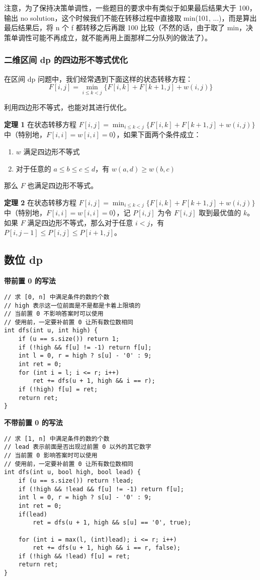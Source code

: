 \documentclass[UTF8]{article}
\begin{document}
注意，为了保持决策单调性，一些题目的要求中有类似于如果最后结果大于 100，输出 no solution，这个时候我们不能在转移过程中直接取 min(101, ...)，而是算出最后结果后，将 n 个 f 都转移之后再跟 100 比较（不然的话，由于取了 min，决策单调性可能不再成立，就不能再用上面那样二分队列的做法了）。

\subsubsection{二维区间 dp 的四边形不等式优化}
在区间 dp 问题中，我们经常遇到下面这样的状态转移方程：
$$
F[i, j] = \min_{i \le k < j} \{F[i, k] + F[k + 1, j] + w(i, j) \}
$$

利用四边形不等式，也能对其进行优化。

\noindent \textbf{定理 1} 在状态转移方程 $F[i, j] = \min_{i \le k < j} \{F[i, k] + F[k + 1, j] + w(i, j) \}$ 中（特别地，$F[i, i] = w[i, i] = 0$），如果下面两个条件成立：

\begin{enumerate}
	\item $w$ 满足四边形不等式
	\item 对于任意的 $a \le b \le c \le d$，有 $w(a, d) \ge w(b, c)$ 		
\end{enumerate}

那么 $F$ 也满足四边形不等式。

\noindent \textbf{定理 2} 在状态转移方程 $F[i, j] = \min_{i \le k < j} \{F[i, k] + F[k + 1, j] + w(i, j) \}$ 中（特别地，$F[i, i] = w[i, i] = 0$），记 $P[i, j]$ 为令 $F[i, j]$ 取到最优值的 $k$。如果 $F$ 满足四边形不等式，那么对于任意 $i < j$，有 $P[i, j - 1] \le P[i, j] \le P[i + 1, j]$。


\subsection{数位 dp}

\noindent \textbf{带前置 0 的写法}
\begin{lstlisting}[caption=数位 dp，允许有前置 0]
// 求 [0, n] 中满足条件的数的个数
// high 表示这一位前面是不是都是卡着上限填的
// 当前置 0 不影响答案时可以使用
// 使用前，一定要补前置 0 让所有数位数相同
int dfs(int u, int high) {
    if (u == s.size()) return 1;
    if (!high && f[u] != -1) return f[u];
    int l = 0, r = high ? s[u] - '0' : 9;
    int ret = 0;
	for (int i = l; i <= r; i++) 
		ret += dfs(u + 1, high && i == r);
    if (!high) f[u] = ret;
    return ret;
}
\end{lstlisting}


\noindent \textbf{不带前置 0 的写法}
\begin{lstlisting}[caption=数位 dp，不允许有前置 0]
// 求 [1, n] 中满足条件的数的个数
// lead 表示前面是否出现过前置 0 以外的其它数字
// 当前置 0 影响答案时可以使用
// 使用前，一定要补前置 0 让所有数位数相同
int dfs(int u, bool high, bool lead) {
    if (u == s.size()) return !lead;
    if (!high && !lead && f[u] != -1) return f[u];
    int l = 0, r = high ? s[u] - '0' : 9;
    int ret = 0;
    if(lead)
        ret = dfs(u + 1, high && s[u] == '0', true);

    for (int i = max(l, (int)lead); i <= r; i++) 
        ret += dfs(u + 1, high && i == r, false);
    if (!high && !lead) f[u] = ret;
    return ret;
}
\end{lstlisting}
\end{document}
